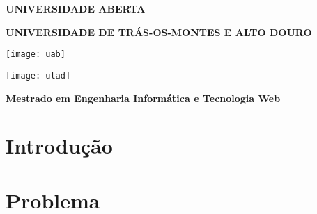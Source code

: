 \documentclass[12pt,a4paper,final]{article}
\begin{document}
    \title{\Titulo}
    \author{\Autor}
    \date{\Ano}
    \begin{titlepage}
        \begin{center}
            \vspace*{4cm}

            \textbf{\large UNIVERSIDADE ABERTA}

            \textbf{\large UNIVERSIDADE DE TRÁS-OS-MONTES E ALTO DOURO}

            \vspace{1cm}

            \begin{minipage}{0.4\textwidth}
                \centering
                \texttt{[image: uab]}
            \end{minipage}
            \begin{minipage}{0.4\textwidth}
                \centering
                \texttt{[image: utad]}
            \end{minipage}

            \vspace{1.5cm}

            \textbf{\large \Titulo}

            \vspace{1.5cm}

            \textbf{\large \Autor}

            \vspace{2cm}

            \textbf{\large Mestrado em Engenharia Informática e Tecnologia Web}
            \vfill
            \textbf{\Ano}
        \end{center}
    \end{titlepage}
    \renewcommand{\contentsname}{Índice}
    \cleardoublepage
    \tableofcontents
    \newpage
    \listoftables
    \newpage
    \cleardoublepage


    \section{Introdução}\label{sec:introducao}
    


    \section{Problema}\label{sec:problema}
    
\end{document}
